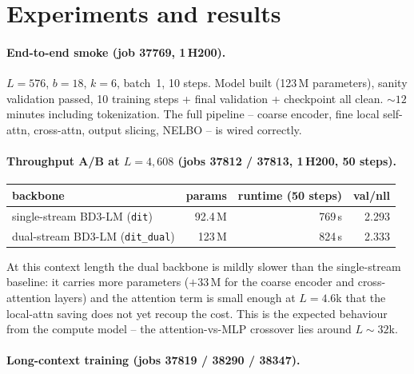 \documentclass[11pt,a4paper]{article}
\begin{document}
\section{Experiments and results}

\paragraph{End-to-end smoke (job 37769, 1\,H200).}
\(L\!=\!576\), \(b\!=\!18\), \(k\!=\!6\), batch~1, 10 steps. Model built
(123\,M parameters), sanity validation passed, 10 training steps + final
validation + checkpoint all clean. \(\sim\!12\) minutes including
tokenization. The full pipeline -- coarse encoder, fine local self-attn,
cross-attn, output slicing, NELBO -- is wired correctly.

\paragraph{Throughput A/B at \(L\!=\!4{,}608\) (jobs 37812 / 37813, 1\,H200, 50 steps).}

\begin{table}[h]
\centering
\begin{tabular}{l r r r}
\toprule
backbone & params & runtime (50 steps) & val/nll \\
\midrule
single-stream BD3-LM (\texttt{dit})       & 92.4\,M & 769\,s & 2.293 \\
dual-stream BD3-LM (\texttt{dit\_dual})   & 123\,M  & 824\,s & 2.333 \\
\bottomrule
\end{tabular}
\end{table}

\noindent At this context length the dual backbone is mildly slower than the
single-stream baseline: it carries more parameters
(\(+33\)\,M for the coarse encoder and cross-attention layers) and the
attention term is small enough at \(L\!=\!4.6\)k that the local-attn saving
does not yet recoup the cost. This is the expected behaviour from the compute
model -- the attention-vs-MLP crossover lies around \(L\!\sim\!32\)k.

\paragraph{Long-context training (jobs 37819 / 38290 / 38347).}
\end{document}
